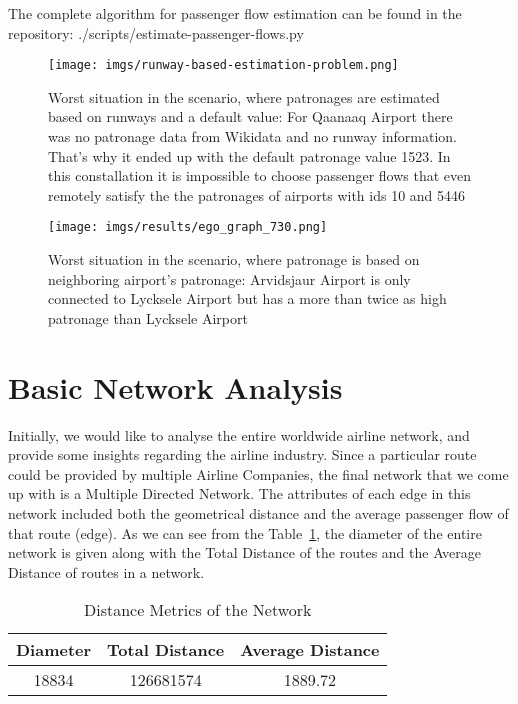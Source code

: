 \documentclass[twocolumn]{tum-article}
\begin{document}
The complete algorithm for passenger flow estimation can be found in the repository: ./scripts/estimate-passenger-flows.py

\begin{figure}[h]
	\centering
	\texttt{[image: imgs/runway-based-estimation-problem.png]}
	\caption{Worst situation in the scenario, where patronages are estimated based on runways and a default value: 
For Qaanaaq Airport there was no patronage data from Wikidata and no runway information. That's why it ended up with the default patronage value 1523. In this constallation it is impossible to choose passenger flows that even remotely satisfy the the patronages of airports with ids 10 and 5446}
	\label{fig:impossible_flows}
\end{figure}

\begin{figure}[h]

	\centering
	\texttt{[image: imgs/results/ego\_graph\_730.png]}
	\caption{Worst situation in the scenario, where patronage is based on neighboring airport's patronage: 
Arvidsjaur Airport is only connected to Lycksele Airport but has a more than twice as high patronage than Lycksele Airport}
	\label{fig:worst_flow_fit}
\end{figure}
\section{Basic Network Analysis}
Initially, we would like to analyse the entire worldwide airline network, and provide some insights regarding the airline industry.
Since a particular route could be provided by multiple Airline Companies, the final network that we come up with is a Multiple Directed Network.
The attributes of each edge in this network included both the geometrical distance and the average passenger flow of that route (edge). 
As we can see from the Table~\ref{Tab:distance_metrics}, the diameter of the entire network is given along with the Total Distance of the routes and the Average Distance of routes in a network.  

\begin{center}
\begin{table}[ht]	
 \begin{tabular}{| c | c | c |}
 \hline
 Diameter & Total Distance & Average Distance \\ [0.5ex]
 \hline
 18834 & 126681574 & 1889.72 \\
 \hline
 \end{tabular}
\caption{Distance Metrics of the Network}
\label{Tab:distance_metrics}	 
\end{table}
\end{center}
\end{document}
